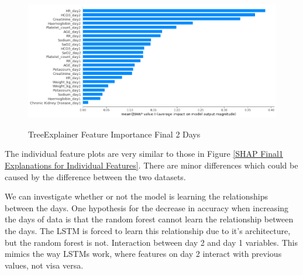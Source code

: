 \documentclass[12pt]{article}
\begin{document}
\begin{figure}[H]
\centering\caption{TreeExplainer Feature Importance Final 2 Days}
\includegraphics[scale=0.4]{TreeExplainer Final2/TreeExplainer Final2 Feature Importance.png}
\label{TreeExplainer Feature Importance Final 2 Days}
\end{figure}

The individual feature plots are very similar to those in Figure \ref{SHAP Final1 Explanations for Individual Features}. There are minor differences which could be caused by the difference between the two datasets. 


We can investigate whether or not the model is learning the relationships between the days. One hypothesis for the decrease in accuracy when increasing the days of data is that the random forest cannot learn the relationship between the days. The LSTM is forced to learn this relationship due to it's architecture, but the random forest is not. Interaction between day 2 and day 1 variables. This mimics the way LSTMs work, where features on day 2 interact with previous values, not visa versa.
\end{document}
